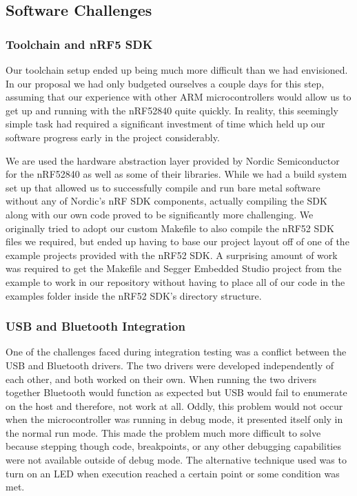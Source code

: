 \subsection{Software Challenges}

\subsubsection{Toolchain and nRF5 SDK}
\label{sec:toolchain-issues}

Our toolchain setup ended up being much more difficult than we had envisioned.
In our proposal we had only budgeted ourselves a couple days for this step,
assuming that our experience with other ARM microcontrollers would allow us to
get up and running with the nRF52840 quite quickly. In reality, this seemingly
simple task had required a significant investment of time which held up our
software progress early in the project considerably.

We are used the hardware abstraction layer provided by Nordic
Semiconductor for the nRF52840 as well as some of their libraries. While we had
a build system set up that allowed us to successfully compile and run bare metal
software without any of Nordic's nRF SDK components, actually compiling the SDK 
along with our own code proved to be significantly more challenging. We 
originally tried to adopt our custom Makefile to also compile the nRF52 SDK files 
we required, but ended up having to base our project layout off of one of the 
example projects provided with the nRF52 SDK. A surprising amount of work was 
required to get the Makefile and Segger Embedded Studio project from the example 
to work in our repository without having to place all of our code in the examples 
folder inside the nRF52 SDK's directory structure.

\subsubsection{USB and Bluetooth Integration}

One of the challenges faced during integration testing was a conflict between 
the USB and Bluetooth drivers. The two drivers were developed independently of
each other, and both worked on their own. When running the two drivers together
Bluetooth would function as expected but USB would fail to enumerate on the host
and therefore, not work at all. Oddly, this problem would not occur when the 
microcontroller was running in debug mode, it presented itself only in the 
normal run mode. This made the problem much more difficult to solve because
stepping though code, breakpoints, or any other debugging capabilities were not
available outside of debug mode. The alternative technique used was to turn on 
an LED when execution reached a certain point or some condition was met. 

